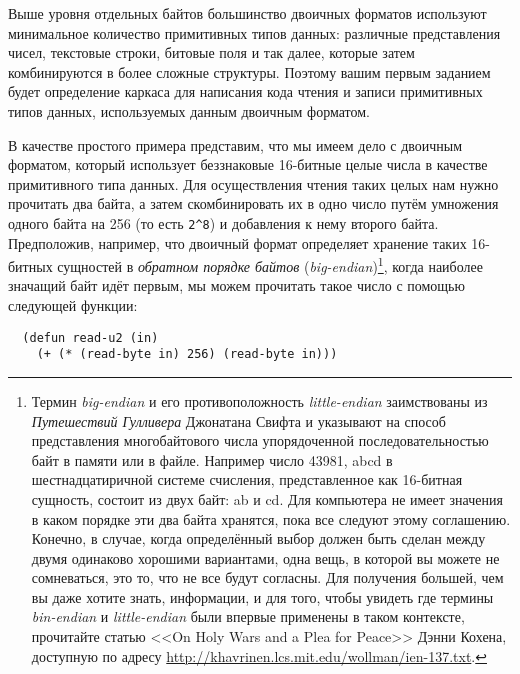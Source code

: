 Выше уровня отдельных байтов большинство двоичных форматов используют минимальное
количество примитивных типов данных: различные представления чисел, текстовые строки,
битовые поля и так далее, которые затем комбинируются в более сложные структуры. Поэтому
вашим первым заданием будет определение каркаса для написания кода чтения и записи
примитивных типов данных, используемых данным двоичным форматом.

В качестве простого примера представим, что мы имеем дело с двоичным форматом, который
использует беззнаковые 16-битные целые числа в качестве примитивного типа данных. Для
осуществления чтения таких целых нам нужно прочитать два байта, а затем скомбинировать их
в одно число путём умножения одного байта на 256 (то есть \lstinline!2^8!) и добавления к
нему второго байта. Предположив, например, что двоичный формат определяет хранение таких
16-битных сущностей в \textit{обратном порядке байтов}
(\textit{big-endian})\footnote{Термин \textit{big-endian} и его противоположность
  \textit{little-endian} заимствованы из \textit{Путешествий Гулливера} Джонатана Свифта и
  указывают на способ представления многобайтового числа упорядоченной последовательностью
  байт в памяти или в файле. Например число 43981, abcd в шестнадцатиричной системе
  счисления, представленное как 16-битная сущность, состоит из двух байт: ab и cd. Для
  компьютера не имеет значения в каком порядке эти два байта хранятся, пока все следуют
  этому соглашению. Конечно, в случае, когда определённый выбор должен быть сделан между
  двумя одинаково хорошими вариантами, одна вещь, в которой вы можете не сомневаться, это
  то, что не все будут согласны. Для получения большей, чем вы даже хотите знать,
  информации, и для того, чтобы увидеть где термины \textit{bin-endian} и
  \textit{little-endian} были впервые применены в таком контексте, прочитайте статью <<On
  Holy Wars and a Plea for Peace>> Дэнни Кохена, доступную по адресу
  \url{http://khavrinen.lcs.mit.edu/wollman/ien-137.txt}.}, когда наиболее значащий байт идёт
первым, мы можем прочитать такое число с помощью следующей функции:

\begin{lstlisting}
  (defun read-u2 (in)
    (+ (* (read-byte in) 256) (read-byte in)))
\end{lstlisting}

